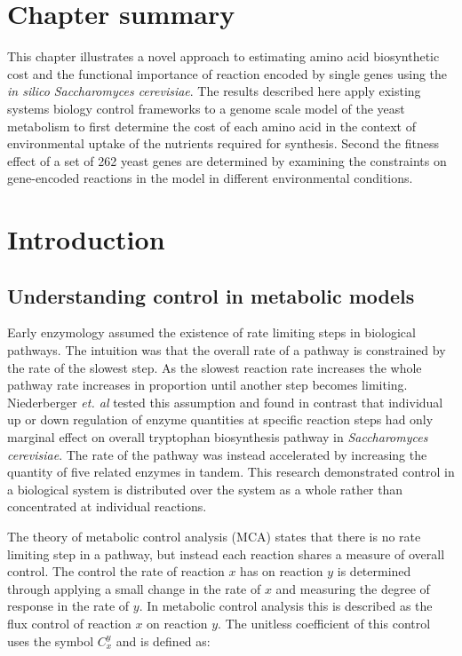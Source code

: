 \section*{Chapter summary}%

This chapter illustrates a novel approach to estimating amino acid biosynthetic cost and the functional importance of reaction encoded by single genes using the \emph{in silico} \emph{Saccharomyces cerevisiae}. The results described here apply existing systems biology control frameworks to a genome scale model of the yeast metabolism to first determine the cost of each amino acid in the context of environmental uptake of the nutrients required for synthesis. Second the fitness effect of a set of 262 yeast genes are determined by examining the constraints on gene-encoded reactions in the model in different environmental conditions.

\clearpage

\section{Introduction} %

\subsection{Understanding control in metabolic models}%

Early enzymology assumed the existence of rate limiting steps in biological pathways. The intuition was that the overall rate of a pathway is constrained by the rate of the slowest step. As the slowest reaction rate increases the whole pathway rate increases in proportion until another step becomes limiting. Niederberger \emph{et. al} \cite{niederberger1992} tested this assumption and found in contrast that individual up or down regulation of enzyme quantities at specific reaction steps had only marginal effect on overall tryptophan biosynthesis pathway in \emph{Saccharomyces cerevisiae}. The rate of the pathway was instead accelerated by increasing the quantity of five related enzymes in tandem. This research demonstrated control in a biological system is distributed over the system as a whole rather than concentrated at individual reactions.

The theory of metabolic control analysis (MCA) \cite{fell1992,fell1997} states that there is no rate limiting step in a pathway, but instead each reaction shares a measure of overall control. The control the rate of reaction $x$ has on reaction $y$ is determined through applying a small change in the rate of $x$ and measuring the degree of response in the rate of $y$. In metabolic control analysis this is described as the flux control of reaction $x$ on reaction $y$. The unitless coefficient of this control uses the symbol $C_{x}^{y}$ and is defined as:


